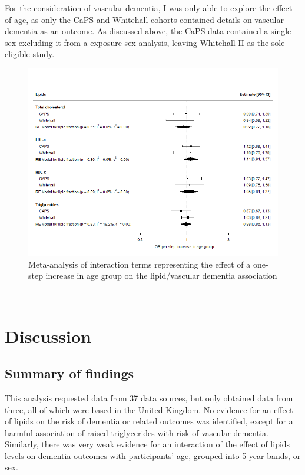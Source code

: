 \documentclass[a4paper, twoside]{templates/ociamthesis}
\begin{document}
For the consideration of vascular dementia, I was only able to explore the effect of age, as only the CaPS and Whitehall cohorts contained details on vascular dementia as an outcome. As discussed above, the CaPS data contained a single sex excluding it from a exposure-sex analysis, leaving Whitehall II as the sole eligible study.





\begin{figure}[H]
\includegraphics[width=1\linewidth]{figures/ipd/interaction_age_vasdem} \caption[shortcap]{Meta-analysis of interaction terms representing the effect of a one-step increase in age group on the lipid/vascular dementia association}\label{fig:interactionVascularAge}
\end{figure}

~

\hypertarget{discussion-3}{%
\section{Discussion}\label{discussion-3}}

\hypertarget{summary-of-findings-2}{%
\subsection{Summary of findings}\label{summary-of-findings-2}}

This analysis requested data from 37 data sources, but only obtained data from three, all of which were based in the United Kingdom. No evidence for an effect of lipids on the risk of dementia or related outcomes was identified, except for a harmful association of raised triglycerides with risk of vascular dementia. Similarly, there was very weak evidence for an interaction of the effect of lipids levels on dementia outcomes with participants' age, grouped into 5 year bands, or sex.
\end{document}
